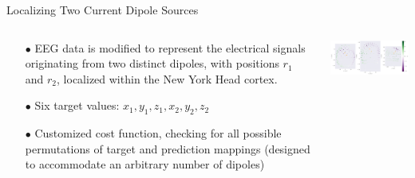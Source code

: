 \documentclass[aspectratio=169, 9pt]{beamer}
\begin{document}
\begin{frame}{Localizing Two Current Dipole Sources}
  \begin{columns}
    \begin{column}{0.5\textwidth}
      \begin{itemize}
        \item[$\bullet$] EEG data is modified to represent the electrical signals originating from two distinct dipoles, with positions $r_1$ and $r_2$, localized within the New York Head cortex.
        \item[$\bullet$] Six target values: $x_1, y_1, z_1, x_2, y_2, z_2$
        \item[$\bullet$] Customized cost function, checking for all possible permutations of target and prediction mappings (designed to accommodate an arbitrary number of dipoles)
    \end{itemize}
    \end{column}
    \begin{column}{0.5\textwidth}
    \includegraphics[width=7cm]{figures/dipoles_w_amplitudes_eeg_field_2_20.pdf}
    \end{column}
  \end{columns}
\end{frame}
\end{document}
